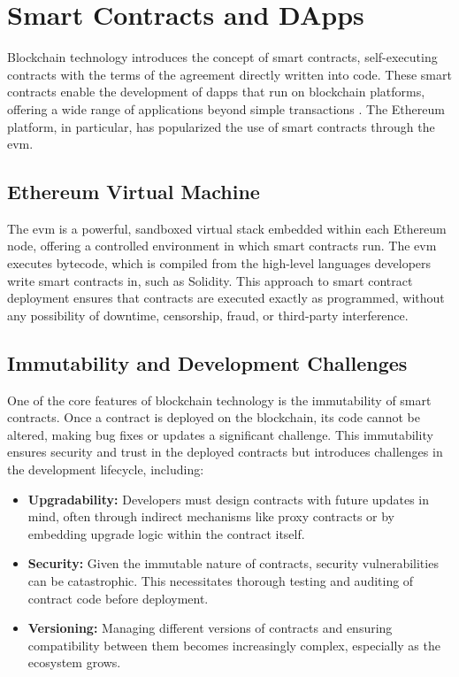 \section{Smart Contracts and DApps}

Blockchain technology introduces the concept of smart contracts, self-executing contracts with the terms of the agreement directly written into code. These smart contracts enable the development of \gls{dapps} that run on blockchain platforms, offering a wide range of applications beyond simple transactions \cite{szabo1997formalizing, wood2014ethereum}. The Ethereum platform, in particular, has popularized the use of smart contracts through the \gls{evm}.

\subsection{Ethereum Virtual Machine}

The \gls{evm} is a powerful, sandboxed virtual stack embedded within each Ethereum node, offering a controlled environment in which smart contracts run. The \gls{evm} executes bytecode, which is compiled from the high-level languages developers write smart contracts in, such as Solidity. This approach to smart contract deployment ensures that contracts are executed exactly as programmed, without any possibility of downtime, censorship, fraud, or third-party interference.

\subsection{Immutability and Development Challenges}

One of the core features of blockchain technology is the immutability of smart contracts. Once a contract is deployed on the blockchain, its code cannot be altered, making bug fixes or updates a significant challenge. This immutability ensures security and trust in the deployed contracts but introduces challenges in the development lifecycle, including:

\begin{itemize}
    \item \textbf{Upgradability:} Developers must design contracts with future updates in mind, often through indirect mechanisms like proxy contracts or by embedding upgrade logic within the contract itself.
    \item \textbf{Security:} Given the immutable nature of contracts, security vulnerabilities can be catastrophic. This necessitates thorough testing and auditing of contract code before deployment.
    \item \textbf{Versioning:} Managing different versions of contracts and ensuring compatibility between them becomes increasingly complex, especially as the ecosystem grows.
\end{itemize}

